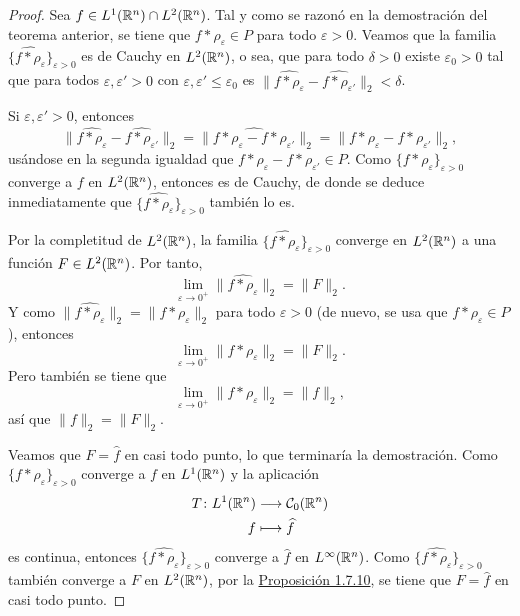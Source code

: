 \documentclass[a4paper, 11pt, oneside]{report}
\begin{document}
\begin{proof}
  Sea $f \in L^1(\mathbb R^n) \cap L^2(\mathbb R^n)$. Tal y como se razonó en la demostración del teorema anterior, se tiene que $f \ast \rho_\varepsilon \in P$ para todo $\varepsilon > 0$. Veamos que la familia $\{\widehat{f \ast \rho_\varepsilon}\}_{\varepsilon > 0}$ es de Cauchy en $L^2(\mathbb R^n)$, o sea, que para todo $\delta > 0$ existe $\varepsilon_0 > 0$ tal que para todos $\varepsilon, \varepsilon' > 0$ con $\varepsilon, \varepsilon' \leq \varepsilon_0 $ es $\|\widehat{f \ast \rho_\varepsilon} - \widehat{f \ast \rho_{\varepsilon'}}\|_2 < \delta$.

  Si $\varepsilon, \varepsilon' > 0$, entonces
  \[\|\widehat{f \ast \rho_\varepsilon} - \widehat{f \ast \rho_{\varepsilon'}}\|_2 = \|\widehat{f \ast \rho_\varepsilon - f \ast \rho_{\varepsilon'}}\|_2 = \|f \ast \rho_\varepsilon - f \ast \rho_{\varepsilon'}\|_2,\]
  usándose en la segunda igualdad que $f\ast \rho_\varepsilon - f \ast \rho_{\varepsilon'} \in P$. Como $\{f \ast \rho_\varepsilon\}_{\varepsilon > 0}$ converge a $f$ en $L^2(\mathbb R^n)$, entonces es de Cauchy, de donde se deduce inmediatamente que $\{\widehat{f \ast \rho_\varepsilon}\}_{\varepsilon > 0}$ también lo es.

  Por la completitud de $L^2(\mathbb R^n)$, la familia $\{\widehat{f \ast \rho_\varepsilon}\}_{\varepsilon > 0}$ converge en $L^2(\mathbb R^n)$ a una función $F \in L^2(\mathbb R^n)$. Por tanto,
  \[\lim_{\varepsilon \to 0^+} \|\widehat{f \ast \rho_\varepsilon}\|_2 = \|F\|_2.\]
  Y como $\|\widehat{f \ast \rho_\varepsilon}\|_2 = \|{f \ast \rho_\varepsilon}\|_2$ para todo $\varepsilon > 0$ (de nuevo, se usa que $f  \ast \rho_\varepsilon \in P$), entonces
  \[\lim_{\varepsilon \to 0^+} \|f \ast \rho_\varepsilon\|_2 = \|F\|_2.\]
  Pero también se tiene que
  \[\lim_{\varepsilon \to 0^+} \|f \ast \rho_\varepsilon\|_2 = \|f\|_2,\]
  así que $\|f\|_2 = \|F\|_2$. 
  
  Veamos que $F = \widehat{f}$ en casi todo punto, lo que terminaría la demostración. Como $\{f \ast \rho_\varepsilon\}_{\varepsilon > 0}$ converge a $f$ en $L^1(\mathbb R^n)$ y la aplicación
  \[\begin{aligned}[t]
    T \colon L^1(\mathbb R^n) &\longrightarrow \mathcal{C}_0(\mathbb R^n) \\
    f &\longmapsto \widehat{f}
  \end{aligned}\]
  es continua, entonces $\{\widehat{f \ast \rho_\varepsilon}\}_{\varepsilon > 0}$ converge a $\widehat{f}$ en $L^\infty(\mathbb R^n)$. Como $\{\widehat{f \ast \rho_\varepsilon}\}_{\varepsilon > 0}$ también converge a $F$ en $L^2(\mathbb R^n)$, por la \hyperref[pro:1.8.10]{\color{c1}Proposición 1.7.10}, se tiene que $F = \widehat{f}$ en casi todo punto.
\end{proof}
\end{document}

